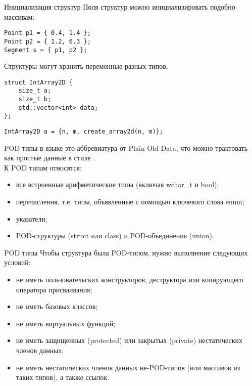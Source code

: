 \documentclass{beamer}
\begin{document}
\begin{frame}[fragile]{Инициализация структур}
    Поля структур можно инициализировать подобно массивам:
    \begin{lstlisting}
Point p1 = { 0.4, 1.4 };
Point p2 = { 1.2, 6.3 };
Segment s = { p1, p2 };
    \end{lstlisting}
    Структуры могут хранить переменные разных типов.
    \begin{lstlisting}
struct IntArray2D {
    size_t a;
    size_t b;
    std::vector<int> data;
};
    \end{lstlisting}
    \begin{lstlisting}
IntArray2D a = {n, m, create_array2d(n, m)};
    \end{lstlisting}
\end{frame}

\begin{frame}[fragile]{POD типы}
     в языке \langcpp это аббревиатура от Plain Old Data, 
    что можно трактовать как простые данные в стиле \langc.\\
    К POD типам относятся:
    \begin{itemize}
        \item все встроенные арифметические типы (включая wchar\_t и bool);
        \item перечисления, т.е. типы, объявленные с помощью ключевого слова enum;
        \item указатели;
        \item POD-структуры (struct или class) и POD-объединения (union).
    \end{itemize}
\end{frame}

\begin{frame}[fragile]{POD типы}
    Чтобы структура была POD-типом, нужно выполнение следующих условий:
    \begin{itemize}
        \item не иметь пользовательских конструкторов, 
            деструктора или копирующего оператора присваивания;
        \item не иметь базовых классов;
        \item не иметь виртуальных функций;
        \item не иметь защищенных (protected) или закрытых (private) нестатических членов данных;
        \item не иметь нестатических членов данных не-POD-типов (или массивов из таких типов), а также ссылок.
    \end{itemize}
\end{frame}
\end{document}
